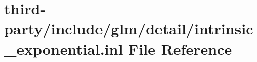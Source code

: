 \hypertarget{intrinsic__exponential_8inl}{}\section{third-\/party/include/glm/detail/intrinsic\+\_\+exponential.inl File Reference}
\label{intrinsic__exponential_8inl}
